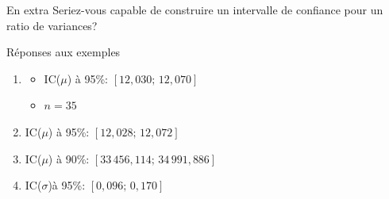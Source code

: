 \documentclass{BeamerTemplate}
\begin{document}
\begin{frame}[t]{En extra}
    Seriez-vous capable de construire un intervalle de confiance pour un ratio de variances?
\end{frame}
\begin{frame}[t]{Réponses aux exemples}

{\scriptsize

\begin{enumerate}
  \item
      \begin{itemize}
      \item[b)] {\scriptsize IC($\mu$) à 95\%: $[12,030;\,12,070]$}
      \item[c)] {\scriptsize $n=35$}
     \end{itemize}
 \item IC($\mu$) à 95\%: $[12,028;\,12,072]$
 \item IC($\mu$) à 90\%: $[33\, 456,114 ; \, 34\, 991,886 ]$
 \item IC($\sigma$)à 95\%: $[0,096; \, 0,170]$
 \end{enumerate}
 }
\end{frame}
\end{document}
